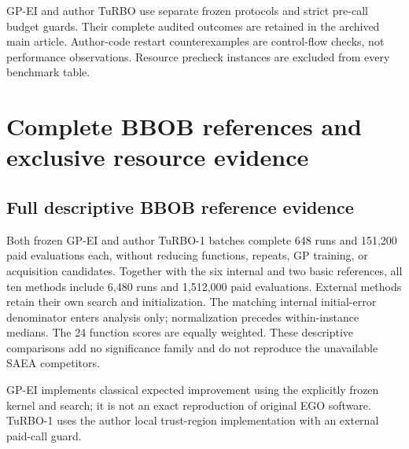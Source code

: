 \documentclass[suppldata]{interact}
\begin{document}
\endgroup

GP-EI and author TuRBO use separate frozen protocols and strict pre-call budget guards. Their complete audited outcomes are retained in the archived main article. Author-code restart counterexamples are control-flow checks, not performance observations. Resource precheck instances are excluded from every benchmark table.

\hypertarget{complete-bbob-references-and-exclusive-resource-evidence}{%
\section{Complete BBOB references and exclusive resource evidence}\label{complete-bbob-references-and-exclusive-resource-evidence}}

\hypertarget{full-descriptive-bbob-reference-evidence}{%
\subsection{Full descriptive BBOB reference evidence}\label{full-descriptive-bbob-reference-evidence}}

Both frozen GP-EI and author TuRBO-1 batches complete 648 runs and 151,200 paid evaluations each, without reducing functions, repeats, GP training, or acquisition candidates. Together with the six internal and two basic references, all ten methods include 6,480 runs and 1,512,000 paid evaluations. External methods retain their own search and initialization. The matching internal initial-error denominator enters analysis only; normalization precedes within-instance medians. The 24 function scores are equally weighted. These descriptive comparisons add no significance family and do not reproduce the unavailable SAEA competitors.

GP-EI implements classical expected improvement \citep{ref03} using the explicitly frozen kernel and search; it is not an exact reproduction of original EGO software. TuRBO-1 uses the author local trust-region implementation \citep{ref25} with an external paid-call guard.

\FloatBarrier\begingroup\fontsize{8.5}{10.5}\selectfont\setlength\tabcolsep{3pt}
\end{document}
